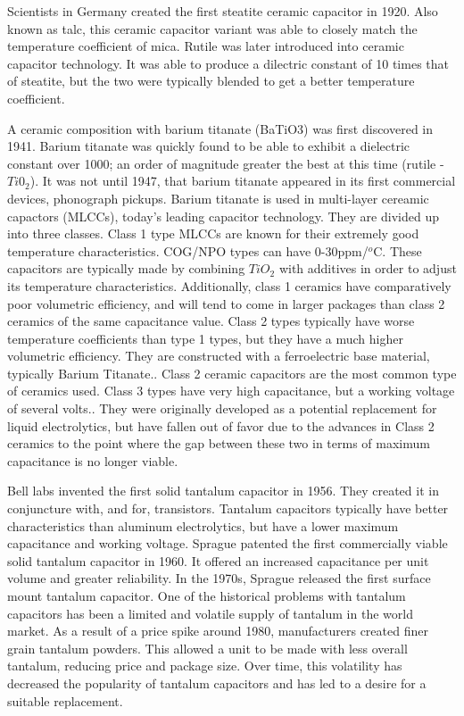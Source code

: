Scientists in Germany created the first steatite ceramic capacitor in 1920. \cite[Ch 3 Sec II]{cerMaterials} \cite{cerDie} Also known as talc, this ceramic capacitor variant was able to closely match the temperature coefficient of mica.\cite{steatite_hf} Rutile was later introduced into ceramic capacitor technology. It was able to produce a dilectric constant of 10 times that of steatite, but the two were typically blended to get a better temperature coefficient. 

A ceramic composition with barium titanate (BaTiO3) was first discovered in 1941. Barium titanate was quickly found to be able to exhibit a dielectric constant over 1000; an order of magnitude greater the best at this time (rutile - $Ti0_2$). It was not until 1947, that barium titanate appeared in its first commercial devices, phonograph pickups.\cite{piezCer}\cite{hist_cerFilt}\cite[Ch 3 Sec III]{cerMaterials} Barium titanate is used in multi-layer cereamic capactors (MLCCs), today's leading capacitor technology. They are divided up into three classes. Class 1 type MLCCs are known for their extremely good temperature characteristics. COG/NPO types can have 0-30ppm/$^o$C. These capacitors are typically made by combining $TiO_2$ with additives in order to adjust its temperature characteristics\cite{intro_cerCaps}. Additionally, class 1 ceramics have comparatively poor volumetric efficiency, and will tend to come in larger packages than class 2 ceramics of the same capacitance value. Class 2 types typically have worse temperature coefficients than type 1 types, but they have a much higher volumetric efficiency. They are constructed with a ferroelectric base material, typically Barium Titanate.\cite{intro_cerCaps}. Class 2 ceramic capacitors are the most common type of ceramics used. Class 3 types have very high capacitance, but a working voltage of several volts.\cite{hist_cerFilt}\cite[Ch 3 Sec VI]{cerMaterials}\cite{atCer_tempco}. They were originally developed as a potential replacement for liquid electrolytics, but have fallen out of favor due to the advances in Class 2 ceramics to the point where the gap between these two in terms of maximum capacitance is no longer viable\cite{wiki_cer}.

Bell labs invented the first solid tantalum capacitor in 1956. They created it in conjuncture with, and for, transistors.\cite[f.~56-64]{dumInv} Tantalum capacitors typically have better characteristics than aluminum electrolytics, but have a lower maximum capacitance and working voltage.\cite{learn_caps}
Sprague patented the first commercially viable solid tantalum capacitor in 1960. It offered an increased capacitance per unit volume and greater reliability.\cite{charTant} In the 1970s, Sprague released the first surface mount tantalum capacitor.\cite{spragueHist}
One of the historical problems with tantalum capacitors has been a limited and volatile supply of tantalum in the world market. 
As a result of a price spike around 1980, manufacturers created finer grain tantalum powders. This allowed a unit to be made with less overall tantalum, reducing price and package size.\cite[ch~3.1]{tantMis}
Over time, this volatility has decreased the popularity of tantalum capacitors and has led to a desire for a suitable replacement.

